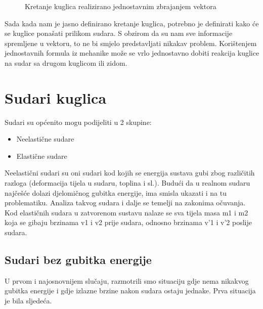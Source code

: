 \begin{figure}[!http]
	\begin{center}
	\end{center}
	\caption {Kretanje kuglica realizirano jednostavnim zbrajanjem vektora}
	\label{fig:14}
\end{figure}

Sada kada nam je jasno definirano kretanje kuglica, potrebno je definirati kako će se kuglice ponašati prilikom sudara. S obzirom da su nam sve informacije spremljene u vektoru, to ne bi smjelo predstavljati nikakav problem. Korištenjem jednostavnih formula iz mehanike može se vrlo jednostavno dobiti reakcija kuglice na sudar sa drugom kuglicom ili zidom.

\section{Sudari kuglica}

Sudari su općenito mogu podijeliti u 2 skupine:
\begin{itemize}
	\item Neelastične sudare
	\item Elastične sudare
\end{itemize}
Neelastični sudari su oni sudari kod kojih se energija sustava gubi zbog različitih razloga (deformacija tijela u sudaru, toplina i sl.). Budući da u realnom sudaru najčešće dolazi djelomičnog gubitka energije, ima smisla ukazati i na tu problematiku\cite{9}. Analiza takvog sudara i dalje se temelji na zakonima očuvanja. Kod elastičnih sudara u zatvorenom sustavu nalaze se sva tijela masa m1 i m2 koja se gibaju brzinama v1 i v2 prije sudara, odnosno brzinama v'1 i v'2 poslije sudara\cite{9}.
\subsection{Sudari bez gubitka energije} \label{subsec:no_energy}
U prvom i najosnovnijem slučaju, razmotrili smo situaciju gdje nema nikakvog gubitka energije i gdje izlazne brzine nakon sudara ostaju jednake. Prva situacija je bila sljedeća.


